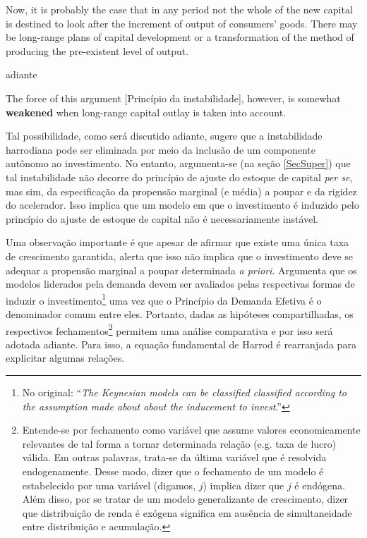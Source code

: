 \begin{citacao}
Now, it is probably the case that in any period not the whole of the new capital is destined to look after the increment of output of consumers' goods. There may be  long-range plans of capital development or a transformation  of the method of  producing  the pre-existent level of output. \cite[p.~17]{harrod_essay_1939}
\end{citacao}
adiante
\begin{citacao}
The force  of this  argument [Princípio da instabilidade], however, is somewhat \textbf{weakened} when long-range  capital outlay is taken into account.
\cite[p.~26, grifos adicionados]{harrod_essay_1939}
\end{citacao}
Tal possibilidade, como será discutido adiante, sugere que a instabilidade harrodiana pode ser eliminada por meio da inclusão de um componente autônomo ao investimento.
No entanto, argumenta-se (na seção \ref{SecSuper}) que tal instabilidade não decorre do princípio de ajuste do estoque de capital \textit{per se}, mas sim, da especificação da propensão marginal (e média) a poupar e da rigidez do acelerador. Isso implica que um modelo em que o investimento é induzido pelo princípio do ajuste de estoque de capital não é necessariamente instável.

Uma observação importante é que apesar de \textcite[p.~23]{harrod_essay_1939} afirmar que existe uma única taxa de crescimento garantida, \textcite[p.~83]{robinson_model_1962} alerta que isso não implica que o investimento %
deve se adequar a propensão marginal a poupar determinada \textit{a priori}. Argumenta que os modelos liderados pela demanda devem ser avaliados pelas respectivas formas de induzir o investimento\footnote{
	No original: ``\textit{The Keynesian models can be classified classified according to the assumption made about about the inducement to invest}.''
} uma vez que o Princípio da Demanda Efetiva é o denominador comum entre eles. Portanto, dadas as hipóteses compartilhadas, os respectivos  fechamentos\footnote{Entende-se por fechamento como variável que assume valores economicamente relevantes de tal forma a tornar determinada relação (e.g. taxa de lucro) válida. Em outras palavras, trata-se da última variável que é resolvida endogenamente. Desse modo, dizer que o fechamento de um modelo é estabelecido por uma variável (digamos, $j$) implica dizer que $j$ é endógena. Além disso, por se tratar de um modelo generalizante de crescimento, dizer que distribuição de renda é exógena significa em ausência de simultaneidade entre distribuição e acumulação.} permitem uma análise comparativa e por isso será adotada adiante. Para isso, a equação fundamental de Harrod é rearranjada para explicitar algumas relações.


